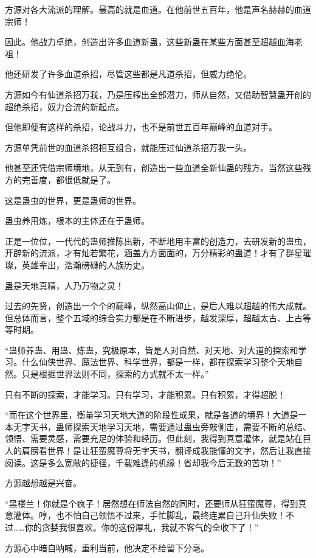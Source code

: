 \begin{this_body}
方源对各大流派的理解。最高的就是血道。在他前世五百年，他是声名赫赫的血道宗师！

因此。他战力卓绝，创造出许多血道新蛊，这些新蛊在某些方面甚至超越血海老祖！

他还研发了许多血道杀招，尽管这些都是凡道杀招，但威力绝伦。

方源如今有仙道杀招万我，乃是压榨出全部潜力，师从自然，又借助智慧蛊开创的超绝杀招，奴力合流的新起点。

但他即便有这样的杀招，论战斗力，也不是前世五百年巅峰的血道对手。

方源单凭前世的血道杀招相互组合，就能压过仙道杀招万我一头。

他甚至还凭借宗师境地，从无到有，创造出一些血道全新仙蛊的残方。当然这些残方的完善度，都很低就是了。

这是蛊虫的世界，更是蛊师的世界。

蛊虫养用炼，根本的主体还在于蛊师。

正是一位位，一代代的蛊师推陈出新，不断地用丰富的创造力，去研发新的蛊虫，开辟新的流派，才有灿若繁花，涵盖方方面面的，万分精彩的蛊道！才有了群星璀璨，英雄辈出，浩瀚磅礴的人族历史。

蛊是天地真精，人乃万物之灵！

过去的先贤，创造出一个个的巅峰，纵然高山仰止，是后人难以超越的伟大成就。但总体而言，整个五域的综合实力都是在不断进步，越发深厚，超越太古、上古等等时期。

“蛊师养蛊、用蛊、炼蛊，究极原本，皆是人对自然、对天地、对大道的探索和学习。什么仙侠世界、魔法世界、科学世界，都是一样，都在探索学习整个天地自然。只是根据世界法则不同，探索的方式就不太一样。”

只有不断的探索，才能学习。只有学习，才能积累。只有积累，才得超脱！

“而在这个世界里，衡量学习天地大道的阶段性成果，就是各道的境界！大道是一本无字天书，蛊师探索天地学习天地，需要通过蛊虫旁敲侧击，需要不断的总结、领悟、需要灵感，需要充足的体验和经历。但此刻，我得到真意灌体，就是站在巨人的肩膀看世界！是让狂蛮魔尊将无字天书，翻译成我能懂的文字，然后让我直接阅读。这是多么宽敞的捷径，千载难逢的机缘！省却我今后无数的苦功！”

方源越想越是兴奋。

“黑楼兰！你就是个疯子！居然想在师法自然的同时，还要师从狂蛮魔尊，得到真意灌体。哼，也不怕自己领悟不过来，手忙脚乱，最终连累自己升仙失败！不过……你的贪婪我很喜欢。你的这份厚礼，我就不客气的全收下了！”

方源心中暗自呐喊，重利当前，他决定不给留下分毫。


\end{this_body}
